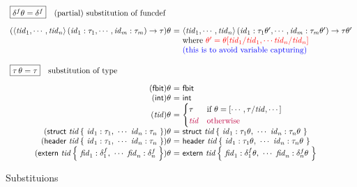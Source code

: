 \documentclass{article}
\newcommand{\inred}{\color{red}}
\newcommand{\inblue}{\color{blue}}
\newcommand{\ryu}{\color{purple}}
\newcommand{\embox}[1]{\mbox{\emph{#1}}}
\newcommand{\prths}[1]{\left(#1\right)}
\newcommand{\braces}[1]{\left\{\ #1\ \right\}}
\newcommand{\ntid}{\embox{tid}}
\newcommand{\nid}{\embox{id}}
\newcommand{\nfid}{\embox{fid}}
\newcommand{\tstruct}{\mathsf{struct}}
\newcommand{\theader}{\mathsf{header}}
\newcommand{\textern}{\mathsf{extern}}
\newcommand{\tfbit}{\mathsf{fbit}}
\newcommand{\tint}{\mathsf{int}}
\newcommand{\topena}{\langle}
\newcommand{\tclosea}{\rangle}
\newcommand{\fnd}{\delta^f}
\begin{document}
\begin{figure}[t]
\[
\begin{array}{r@{~}c@{~}l}
\lefteqn{\fbox{$\fnd \theta = \fnd$}\quad\mbox{(partial) substitution of funcdef}}\hfill\\[1em]
(\topena \ntid_1, \cdots, \ntid_n \tclosea \prths{\nid_1: \tau_1, \cdots, \nid_m: \tau_m} \rightarrow  \tau) \theta
&=& \topena \ntid_1, \cdots, \ntid_n \tclosea \prths{\nid_1: \tau_1 \theta', \cdots, \nid_m: \tau_m \theta'} \rightarrow  \tau \theta'\\
&& \mbox{where \inred $\theta' = \theta[\ntid_1/\ntid_1, \cdots \ntid_n/\ntid_n]$}\\
&& \mbox{\inblue (this is to avoid variable capturing)}\\\\
\lefteqn{\fbox{$\tau\, \theta = \tau$}\quad\mbox{substitution of type}}\hfill\\[1em]
(\tfbit) \theta &=& \tfbit\\
(\tint) \theta &=& \tint\\
(\ntid) \theta &=&
\begin{cases}
\tau&\text{if }\theta = [\cdots, \tau/\ntid, \cdots]\\
\ryu\ntid&\ryu\text{otherwise}
\end{cases}
\\
({\tstruct\ \ntid \braces{\nid_1: \tau_1,\ \cdots\ \nid_n: \tau_n}})\theta &=&
{\tstruct\ \ntid \braces{\nid_1: \tau_1 \theta,\ \cdots\ \nid_n: \tau_n \theta}}\\
({\theader\ \ntid \braces{\nid_1: \tau_1,\ \cdots\ \nid_n: \tau_n}})\theta &=&
{\theader\ \ntid \braces{\nid_1: \tau_1 \theta,\ \cdots\ \nid_n: \tau_n \theta}}\\
({\textern\ \ntid \braces{\nfid_1: \fnd_1,\ \cdots\ \nfid_n: \fnd_{n}}})\theta &=&
{\textern\ \ntid \braces{\nfid_1: \fnd_1 \theta,\ \cdots\ \nfid_n: \fnd_{n} \theta}}\\
\end{array}
\]
\caption{Substituions}
\label{fig:subs}
\end{figure}
\end{document}
